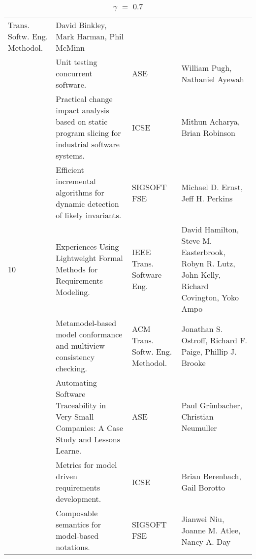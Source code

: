 \begin{table}[h]
{\begin{tabular}{|llll|}
Trans. Softw. Eng. Methodol.& David Binkley, Mark Harman, Phil McMinn \\
\rowcolor{black!20} & Unit testing concurrent software.& ASE& William Pugh, Nathaniel Ayewah \\
 & Practical change impact analysis based on static program slicing for industrial software 
systems.& ICSE& Mithun Acharya, Brian Robinson \\
\rowcolor{black!20} & Efficient incremental algorithms for dynamic detection of likely invariants.& 
SIGSOFT FSE& Michael D. Ernst, Jeff H. Perkins \\
10 & Experiences Using Lightweight Formal Methods for Requirements Modeling.& IEEE Trans. Software 
Eng.& David Hamilton, Steve M. Easterbrook, Robyn R. Lutz, John Kelly, Richard Covington, Yoko Ampo 
\\
\rowcolor{black!20} & Metamodel-based model conformance and multiview consistency checking.& ACM 
Trans. Softw. Eng. Methodol.& Jonathan S. Ostroff, Richard F. Paige, Phillip J. Brooke \\
 & Automating Software Traceability in Very Small Companies: A Case Study and Lessons Learne.& ASE& 
Paul Grünbacher, Christian Neumuller \\
\rowcolor{black!20} & Metrics for model driven requirements development.& ICSE& Brian Berenbach, 
Gail Borotto \\
 & Composable semantics for model-based notations.& SIGSOFT FSE& Jianwei Niu, Joanne M. Atlee, Nancy 
A. Day \\
    \hline
    \end{tabular}
  }
    \caption {$\gamma$ $=$ $0.7$}
\end{table}
